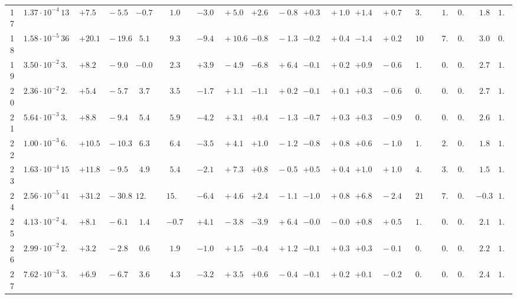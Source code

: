 \documentclass[12pt]{article}
\begin{document}
\begin{table}
\begin{tabular}{ccrr@{\hskip0pt}rrc@{\hskip0pt}r@{\hskip0pt}c@{\hskip0pt}r@{\hskip0pt}rr@{\hskip0pt}rr@{\hskip0pt}rr@{\hskip0pt}rr@{\hskip0pt}r@{\hskip0pt}r@{\hskip0pt}c|rr|r}
17 &$1.37 \cdot 10^{-4}$ &$13.5$  & ${+7.5~}$&${~-5.5}$ & $-0.7$  & &$ 1.0$&&${-3.0~}$&${~+5.0}$ & ${+2.6~}$&${~-0.8}$ & ${+0.3~}$&${~+1.0}$ & ${+1.4~}$&${~+0.7}$ & &$ 3.8$&&$ 1.8$  & $0.96$  & $ 1.8$  & $1.04$   \\ 
18 &$1.58 \cdot 10^{-5}$ &$36.5$  & ${+20.1~}$&${~-19.6}$ & $ 5.1$  & &$ 9.3$&&${-9.4~}$&${~+10.6}$ & ${-0.8~}$&${~-1.3}$ & ${-0.2~}$&${~+0.4}$ & ${-1.4~}$&${~+0.2}$ & &$10.7$&&$ 7.8$  & $0.96$  & $ 3.0$  & $0.98$   \\ 
19 &$3.50 \cdot 10^{-2}$ &$ 3.8$  & ${+8.2~}$&${~-9.0}$ & $-0.0$  & &$ 2.3$&&${+3.9~}$&${~-4.9}$ & ${-6.8~}$&${~+6.4}$ & ${-0.1~}$&${~+0.2}$ & ${+0.9~}$&${~-0.6}$ & &$ 1.8$&&$ 0.3$  & $0.89$  & $ 2.7$  & $1.03$   \\ 
20 &$2.36 \cdot 10^{-2}$ &$ 2.4$  & ${+5.4~}$&${~-5.7}$ & $ 3.7$  & &$ 3.5$&&${-1.7~}$&${~+1.1}$ & ${-1.1~}$&${~+0.2}$ & ${-0.1~}$&${~+0.1}$ & ${+0.3~}$&${~-0.6}$ & &$ 0.8$&&$ 0.4$  & $0.92$  & $ 2.7$  & $1.02$   \\ 
21 &$5.64 \cdot 10^{-3}$ &$ 3.1$  & ${+8.8~}$&${~-9.4}$ & $ 5.4$  & &$ 5.9$&&${-4.2~}$&${~+3.1}$ & ${+0.4~}$&${~-1.3}$ & ${-0.7~}$&${~+0.3}$ & ${+0.3~}$&${~-0.9}$ & &$ 0.9$&&$ 0.7$  & $0.94$  & $ 2.6$  & $1.03$   \\ 
22 &$1.00 \cdot 10^{-3}$ &$ 6.7$  & ${+10.5~}$&${~-10.3}$ & $ 6.3$  & &$ 6.4$&&${-3.5~}$&${~+4.1}$ & ${+1.0~}$&${~-1.2}$ & ${-0.8~}$&${~+0.8}$ & ${+0.6~}$&${~-1.0}$ & &$ 1.8$&&$ 2.5$  & $0.95$  & $ 1.8$  & $1.03$   \\ 
23 &$1.63 \cdot 10^{-4}$ &$15.2$  & ${+11.8~}$&${~-9.5}$ & $ 4.9$  & &$ 5.4$&&${-2.1~}$&${~+7.3}$ & ${+0.8~}$&${~-0.5}$ & ${+0.5~}$&${~+0.4}$ & ${+1.0~}$&${~+1.0}$ & &$ 4.4$&&$ 3.1$  & $0.96$  & $ 1.5$  & $1.05$   \\ 
24 &$2.56 \cdot 10^{-5}$ &$41.4$  & ${+31.2~}$&${~-30.8}$ & $12.1$  & &$15.1$&&${-6.4~}$&${~+4.6}$ & ${+2.4~}$&${~-1.1}$ & ${-1.0~}$&${~+0.8}$ & ${+6.8~}$&${~-2.4}$ & &$21.9$&&$ 7.0$  & $0.94$  & $-0.3$  & $1.07$   \\ 
25 &$4.13 \cdot 10^{-2}$ &$ 4.2$  & ${+8.1~}$&${~-6.1}$ & $ 1.4$  & &$-0.7$&&${+4.1~}$&${~-3.8}$ & ${-3.9~}$&${~+6.4}$ & ${-0.0~}$&${~-0.0}$ & ${+0.8~}$&${~+0.5}$ & &$ 1.7$&&$ 0.3$  & $0.90$  & $ 2.1$  & $1.03$   \\ 
26 &$2.99 \cdot 10^{-2}$ &$ 2.4$  & ${+3.2~}$&${~-2.8}$ & $ 0.6$  & &$ 1.9$&&${-1.0~}$&${~+1.5}$ & ${-0.4~}$&${~+1.2}$ & ${-0.1~}$&${~+0.3}$ & ${+0.3~}$&${~-0.1}$ & &$ 0.7$&&$ 0.3$  & $0.93$  & $ 2.2$  & $1.03$   \\ 
27 &$7.62 \cdot 10^{-3}$ &$ 3.1$  & ${+6.9~}$&${~-6.7}$ & $ 3.6$  & &$ 4.3$&&${-3.2~}$&${~+3.5}$ & ${+0.6~}$&${~-0.4}$ & ${-0.1~}$&${~+0.2}$ & ${+0.1~}$&${~-0.2}$ & &$ 0.8$&&$ 0.6$  & $0.95$  & $ 2.4$  & $1.02$   \\ 

\end{tabular}
\end{table}
\end{document}
